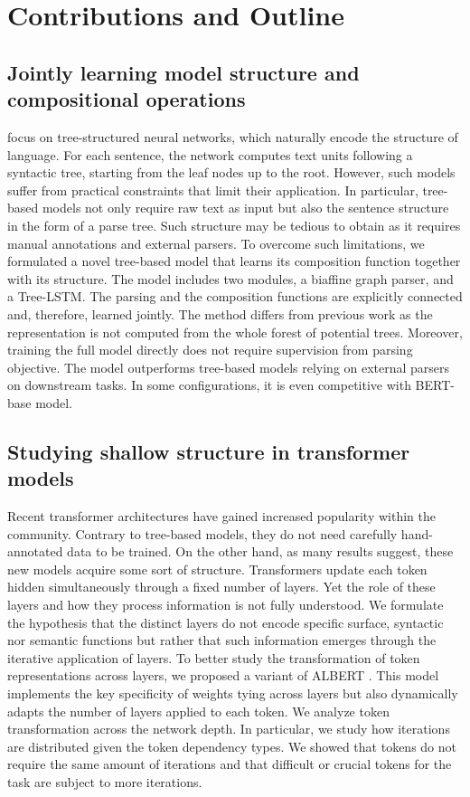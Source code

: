 \section{Contributions and Outline}

\subsection{Jointly learning model structure and compositional operations}

 focus on tree-structured neural networks, which naturally encode the structure of language. For each sentence, the network computes text units following a syntactic tree, starting from the leaf nodes up to the root. However, such models suffer from practical constraints that limit their application. In particular, tree-based models not only require raw text as input but also the sentence structure in the form of a parse tree. Such structure may be tedious to obtain as it requires manual annotations and external parsers. To overcome such limitations, we formulated a novel tree-based model that learns its composition function together with its structure. The model includes two modules, a biaffine graph parser, and a Tree-LSTM. The parsing and the composition functions are explicitly connected and, therefore, learned jointly. The method differs from previous work as the representation is not computed from the whole forest of potential trees. Moreover, training the full model directly does not require supervision from  parsing objective. The model outperforms tree-based models relying on external parsers on downstream tasks. In some configurations, it is even competitive with BERT-base model.

\subsection{Studying shallow structure in transformer models}

Recent transformer architectures have gained increased popularity within the community. Contrary to tree-based models, they do not need carefully hand-annotated data to be trained. On the other hand, as many results suggest, these new models acquire some sort of  structure. Transformers update each token hidden simultaneously through a fixed number of layers. Yet the role of these layers and how they process information is not fully understood. We formulate the hypothesis that the distinct layers do not encode specific surface, syntactic nor semantic functions but rather that such information emerges through the iterative application of layers. To better study the transformation of token representations across layers, we proposed a variant of ALBERT \parencite{simoulin_2021b}. This model implements the key specificity of weights tying across layers but also dynamically adapts the number of layers applied to each token. We analyze token transformation across the network depth. In particular, we study how iterations are distributed given the token dependency types. We showed that tokens do not require the same amount of iterations and that difficult or crucial tokens for the task are subject to more iterations.

